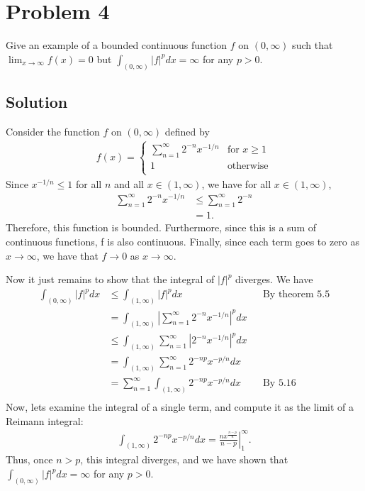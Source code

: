 \documentclass[10pt,a4paper]{article}
\theoremstyle{theorem}
\theoremstyle{definition}
\begin{document}
\section*{Problem 4}
Give an example of a bounded continuous function $f$ on $(0, \infty)$ such that $\lim_{x \to \infty} f(x) = 0$ but $\int_{(0, \infty)} |f|^p dx = \infty$ for any $p > 0$.

\subsection*{Solution}
Consider the function $f$ on $(0, \infty)$ defined by
\begin{align*}
f(x) = \begin{cases} 
     \sum_{n=1}^\infty 2^{-n} x^{-1/n} & \text{for } x \geq 1 \\
     1 & \text{otherwise} \\
\end{cases}
\end{align*}
Since $x^{-1/n} \leq 1$ for all $n$ and all $x \in (1, \infty)$, we have for all $x\in (1, \infty)$,
\begin{align*}
\sum_{n=1}^\infty 2^{-n} x^{-1/n} &\leq  \sum_{n=1}^\infty 2^{-n}\\
&= 1.
\end{align*}
Therefore, this function is bounded. Furthermore, since this is a sum of continuous functions,  f is also continuous.  Finally, since each term goes to zero as $x \to \infty$, we have that $f \to 0$ as $x \to \infty$.

Now it just remains to show that the integral of $|f|^p$ diverges. We have
\begin{align*}
\int_{(0, \infty)} |f|^p dx &\leq \int_{(1, \infty)} |f|^p dx && \text{By theorem 5.5}\\
&= \int_{(1, \infty)} \left| \sum_{n=1}^\infty 2^{-n} x^{-1/n}  \right|^p dx\\
&\leq \int_{(1, \infty)} \sum_{n=1}^\infty \left| 2^{-n} x^{-1/n}  \right|^p dx\\
&=  \int_{(1, \infty)} \sum_{n=1}^\infty 2^{-np} x^{-p/n} dx\\
&=\sum_{n=1}^\infty  \int_{(1, \infty)} 2^{-np} x^{-p/n} dx &&\text{By 5.16}\\
\end{align*}
Now, lets examine the integral of a single term, and compute it as the limit of a Reimann integral:
\begin{align*}
\int_{(1, \infty)} 2^{-np} x^{-p/n} dx =\left. \frac{nx^\frac{n-p}{n}}{n - p} \right|_1^\infty.
\end{align*}
Thus, once $n > p$, this integral diverges, and we have shown that $\int_{(0, \infty)} |f|^p dx = \infty$ for any $p > 0$.
\end{document}
